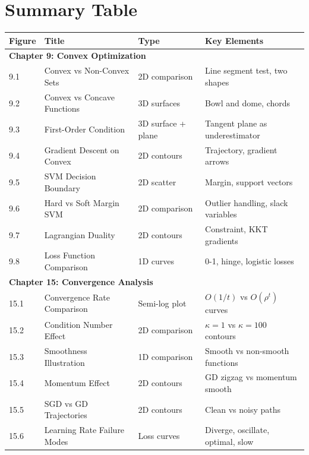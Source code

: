\documentclass[12pt]{article}
\begin{document}
\section{Summary Table}

\begin{longtable}{p{1.5cm}p{4cm}p{3cm}p{5cm}}
\toprule
\textbf{Figure} & \textbf{Title} & \textbf{Type} & \textbf{Key Elements} \\
\midrule
\endhead
\multicolumn{4}{l}{\textbf{Chapter 9: Convex Optimization}} \\
\midrule
9.1 & Convex vs Non-Convex Sets & 2D comparison & Line segment test, two shapes \\
9.2 & Convex vs Concave Functions & 3D surfaces & Bowl and dome, chords \\
9.3 & First-Order Condition & 3D surface + plane & Tangent plane as underestimator \\
9.4 & Gradient Descent on Convex & 2D contours & Trajectory, gradient arrows \\
9.5 & SVM Decision Boundary & 2D scatter & Margin, support vectors \\
9.6 & Hard vs Soft Margin SVM & 2D comparison & Outlier handling, slack variables \\
9.7 & Lagrangian Duality & 2D contours & Constraint, KKT gradients \\
9.8 & Loss Function Comparison & 1D curves & 0-1, hinge, logistic losses \\
\midrule
\multicolumn{4}{l}{\textbf{Chapter 15: Convergence Analysis}} \\
\midrule
15.1 & Convergence Rate Comparison & Semi-log plot & $O(1/t)$ vs $O(\rho^t)$ curves \\
15.2 & Condition Number Effect & 2D comparison & $\kappa=1$ vs $\kappa=100$ contours \\
15.3 & Smoothness Illustration & 1D comparison & Smooth vs non-smooth functions \\
15.4 & Momentum Effect & 2D contours & GD zigzag vs momentum smooth \\
15.5 & SGD vs GD Trajectories & 2D contours & Clean vs noisy paths \\
15.6 & Learning Rate Failure Modes & Loss curves & Diverge, oscillate, optimal, slow \\
\bottomrule
\end{longtable}
\end{document}
